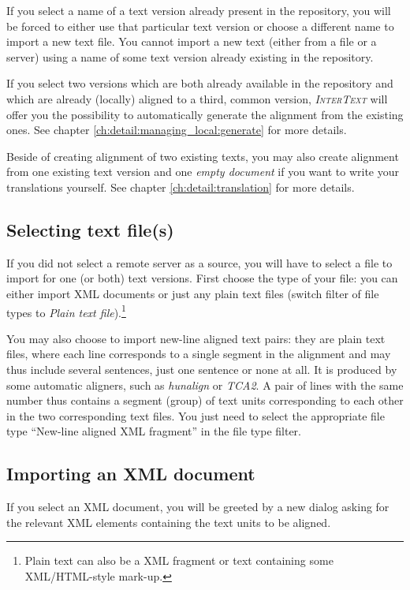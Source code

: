 \documentclass[a4paper,10pt,oneside]{book}
\newcommand{\IT}{\textit{\textsc{InterText}}\xspace}
\begin{document}
If you select a name of a text version already present in the repository, you will be forced to either use that particular text version or choose a different name to import a new text file. You cannot import a new text (either from a file or a server) using a name of some text version already existing in the repository.

If you select two versions which are both already available in the repository and which are already (locally) aligned to a third, common version, \IT will offer you the possibility to automatically generate the alignment from the existing ones. See chapter \ref{ch:detail:managing_local:generate} for more details.

Beside of creating alignment of two existing texts, you may also create alignment from one existing text version and one \emph{empty document} if you want to write your translations yourself. See chapter \ref{ch:detail:translation} for more details.

\subsection{Selecting text file(s)}\label{ch:detail:managing_local:new:files}

If you did not select a remote server as a source, you will have to select a file to import for one (or both) text versions. First choose the type of your file: you can either import XML documents or just any plain text files (switch filter of file types to \emph{Plain text file}).\footnote{Plain text can also be a XML fragment or text containing some XML/HTML-style mark-up.}

You may also choose to import new-line aligned text pairs: they are plain text files, where each line corresponds to a single segment in the alignment and may thus include several sentences, just one sentence or none at all. It is produced by some automatic aligners, such as \emph{hunalign} or \emph{TCA2}. A pair of lines with the same number thus contains a segment (group) of text units corresponding to each other in the two corresponding text files. You just need to select the appropriate file type ``New-line aligned XML fragment'' in the file type filter.

\subsection{Importing an XML document}\label{ch:detail:managing_local:new:xml}

If you select an XML document, you will be greeted by a new dialog asking for the relevant XML elements containing the text units to be aligned.
\end{document}

